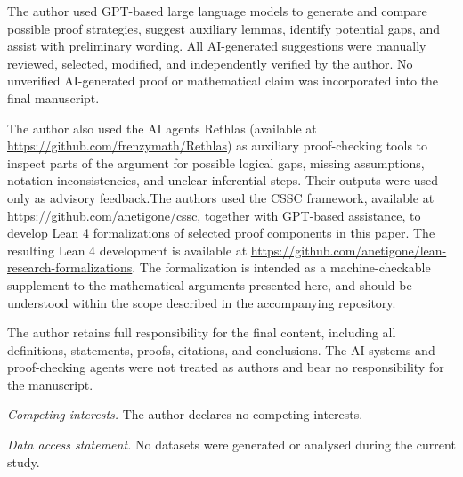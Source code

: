 \documentclass{lms}
\begin{document}
\begin{acknowledgements}
The author used GPT-based large language models to generate and compare possible proof strategies, suggest auxiliary lemmas, identify potential gaps, and assist with preliminary wording. All AI-generated suggestions were manually reviewed, selected, modified, and independently verified by the author. No unverified AI-generated proof or mathematical claim was incorporated into the final manuscript.

The author also used the AI agents Rethlas (available at
\url{https://github.com/frenzymath/Rethlas}) as auxiliary proof-checking tools to inspect parts of the argument for possible logical gaps, missing assumptions, notation inconsistencies, and unclear inferential steps. Their outputs were used only as advisory feedback.The authors used the CSSC framework, available at
\url{https://github.com/anetigone/cssc}, together with GPT-based assistance, to
develop Lean 4 formalizations of selected proof components in this paper. The
resulting Lean 4 development is available at
\url{https://github.com/anetigone/lean-research-formalizations}. The
formalization is intended as a machine-checkable supplement to the mathematical
arguments presented here, and should be understood within the scope described in the accompanying repository.

The author retains full responsibility for the final content, including all definitions, statements, proofs, citations, and conclusions. The AI systems and proof-checking agents were not treated as authors and bear no responsibility for the manuscript.

\textit{Competing interests.} The author declares no competing interests.

\textit{Data access statement.} No datasets were generated or analysed during the current study.
\end{acknowledgements}
\end{document}
